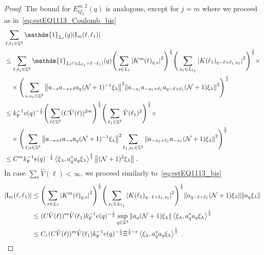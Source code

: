 \documentclass[12pt,a4paper]{article}
\numberwithin{equation}{section}
\newcommand{\1}{\mathbb{I}}
\newcommand{\F}{\mathrm{F}}
\newcommand{\I}{\mathrm{I}}
\newcommand{\Zstar}{\mathbb{Z}^3} %
\newcommand{\Z}{\mathbb{Z}}
\newcommand{\NN}{\mathcal{N}}
\newcommand{\half}{\frac{1}{2}}
\newcommand{\eva}[1]{\left\langle #1 \right\rangle}
\theoremstyle{plain}
\theoremstyle{definition}
\theoremstyle{remark}
\theoremstyle{plain}
\theoremstyle{definition}
\theoremstyle{remark}
\begin{document}
\begin{proof}
The bound for $ E^{m,2}_{Q_2}(q) $ is analogous, except for $ j = m $ where we proceed as in~\eqref{eq:estEQ1113_Coulomb_bis}
\begin{align}
	&\sum_{\ell,\ell_1 \in \Zstar} \mathds{1}_{L_\ell}(q) |\I_m(\ell, \ell_1)| \nonumber\\
	&\leq \sum_{\ell,\ell_1 \in \Zstar} \mathds{1}_{L_\ell \cap (L_{\ell_1}+\ell-\ell_1) }(q)
		\Bigg(\sum\limits_{s \in L_{\ell}} \abs{K^m(\ell)_{q,s}}^2\Bigg)^\half
		\Bigg(\sum\limits_{s_1 \in L_{\ell_1}} \abs{K(\ell_1)_{q-\ell+\ell_1,s_1}}^2\Bigg)^\half \times \nonumber\\
	&\quad \times \Bigg( \sum_{s,s_1 \in \Z^3} \norm{ a_{-s} a_{-s+\ell} a_q (\NN+1)^{-1} \xi_\lambda}^2
		\norm{ a_{-s_1} a_{-s_1+\ell_1} a_{q-\ell+\ell_1} (\NN+1) \xi_\lambda }^2 \Bigg)^{\half} \nonumber\\
	&\leq k_{\F}^{-1} e(q)^{-\frac 12}
		\Bigg(\sum_{\ell \in \Zstar} (C \hat{V}(\ell))^{2m} \Bigg)^\half
		\Bigg(\sum_{\ell_1 \in \Zstar} \hat{V}(\ell_1)^2 \Bigg)^\half \times \nonumber\\
	&\quad \times \Bigg( \sum_{\ell,s \in \Z^3} \norm{a_{-s+\ell} a_{-s} a_q (\NN+1)^{-1} \xi_\lambda}^2
		\sum_{\ell_1,s_1 \in \Z^3} \norm{a_{-s_1+\ell_1} a_{-s_1} (\NN+1) \xi_\lambda }^2 \Bigg)^{\half} \nonumber\\
	&\leq C^m k_{\F}^{-1} e(q)^{-\frac 12} \eva{\xi_\lambda, a_q^* a_q \xi_\lambda}^{\half} \norm{ (\NN+1)^2 \xi_\lambda } \;. \label{eq:estEQ2113_Coulomb_bis}
\end{align}
In case $ \sum_\ell \hat{V}(\ell) < \infty $, we proceed similarly to~\eqref{eq:estEQ1113_bis}
\begin{align}
	|\I_m(\ell, \ell_1)|
	&\leq \Bigg(\sum\limits_{s \in L_{\ell}} \abs{K^m(\ell)_{q,s}}^2\Bigg)^\half
		\Bigg(\sum\limits_{s_1 \in L_{\ell_1}} \abs{K(\ell_1)_{q-\ell+\ell_1,s_1}}^2\Bigg)^\half
		\norm{ a_{q-\ell+\ell_1} (\NN+1) \xi_\lambda}
		\norm{ a_q \xi_\lambda }\nonumber\\
	&\leq (C \hat{V}(\ell))^m \hat{V}(\ell_1) k_{\F}^{-1} e(q)^{-\half}
		\sup_{q \in \Z^3} \norm{ a_q (\NN+1) \xi_\lambda }
		\eva{\xi_\lambda, a_q^* a_q \xi_\lambda}^{\half} \nonumber\\
	&\leq C_\varepsilon (C \hat{V}(\ell))^m
		\hat{V}(\ell_1)
		k_{\F}^{-1} e(q)^{-\half} \Xi^{\half-\varepsilon} \eva{\xi_\lambda, a_q^* a_q \xi_\lambda}^{\half} \;. \label{eq:estEQ2113_bis}
\end{align}
\end{proof}
\end{document}
